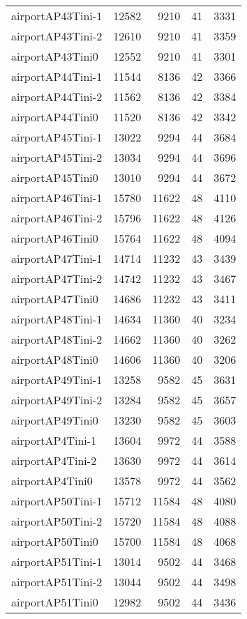 \begin{tabular}{lrrrr}
airportAP43Tini-1 & 12582 & 9210 & 41 & 3331 \\
airportAP43Tini-2 & 12610 & 9210 & 41 & 3359 \\
airportAP43Tini0 & 12552 & 9210 & 41 & 3301 \\
airportAP44Tini-1 & 11544 & 8136 & 42 & 3366 \\
airportAP44Tini-2 & 11562 & 8136 & 42 & 3384 \\
airportAP44Tini0 & 11520 & 8136 & 42 & 3342 \\
airportAP45Tini-1 & 13022 & 9294 & 44 & 3684 \\
airportAP45Tini-2 & 13034 & 9294 & 44 & 3696 \\
airportAP45Tini0 & 13010 & 9294 & 44 & 3672 \\
airportAP46Tini-1 & 15780 & 11622 & 48 & 4110 \\
airportAP46Tini-2 & 15796 & 11622 & 48 & 4126 \\
airportAP46Tini0 & 15764 & 11622 & 48 & 4094 \\
airportAP47Tini-1 & 14714 & 11232 & 43 & 3439 \\
airportAP47Tini-2 & 14742 & 11232 & 43 & 3467 \\
airportAP47Tini0 & 14686 & 11232 & 43 & 3411 \\
airportAP48Tini-1 & 14634 & 11360 & 40 & 3234 \\
airportAP48Tini-2 & 14662 & 11360 & 40 & 3262 \\
airportAP48Tini0 & 14606 & 11360 & 40 & 3206 \\
airportAP49Tini-1 & 13258 & 9582 & 45 & 3631 \\
airportAP49Tini-2 & 13284 & 9582 & 45 & 3657 \\
airportAP49Tini0 & 13230 & 9582 & 45 & 3603 \\
airportAP4Tini-1 & 13604 & 9972 & 44 & 3588 \\
airportAP4Tini-2 & 13630 & 9972 & 44 & 3614 \\
airportAP4Tini0 & 13578 & 9972 & 44 & 3562 \\
airportAP50Tini-1 & 15712 & 11584 & 48 & 4080 \\
airportAP50Tini-2 & 15720 & 11584 & 48 & 4088 \\
airportAP50Tini0 & 15700 & 11584 & 48 & 4068 \\
airportAP51Tini-1 & 13014 & 9502 & 44 & 3468 \\
airportAP51Tini-2 & 13044 & 9502 & 44 & 3498 \\
airportAP51Tini0 & 12982 & 9502 & 44 & 3436 \\

\end{tabular}

